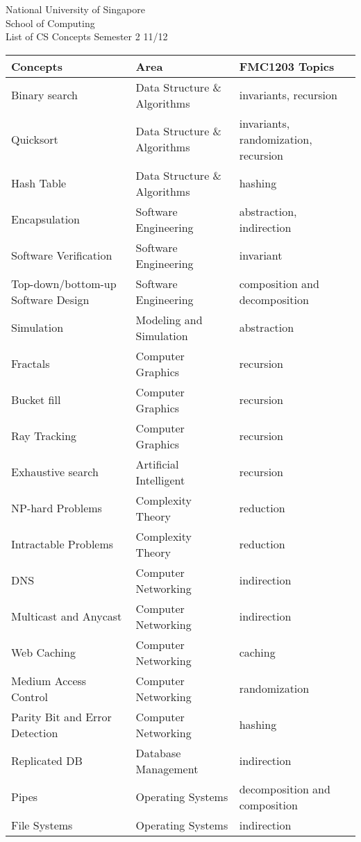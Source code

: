\documentclass[landscape,a4paper,9pt]{exam}
\begin{document}
\extraheadheight{.5in}
%
{\large\sf National University of Singapore\\ School of Computing \\
\LARGE\sf List of CS Concepts}%
{\large\sf Semester 2 11/12}
\firstpageheadrule
\pagestyle{headandfoot}
\centering
\begin{tabular}{|lll|}
\hline
Concepts & Area & FMC1203 Topics \\
\hline
Binary search & Data Structure \& Algorithms & invariants, recursion \\
Quicksort & Data Structure \& Algorithms & invariants, randomization, recursion \\
Hash Table & Data Structure \& Algorithms & hashing \\
\hline
Encapsulation & Software Engineering & abstraction, indirection \\
Software Verification & Software Engineering & invariant\\
Top-down/bottom-up Software Design & Software Engineering & composition and decomposition \\
\hline
Simulation & Modeling and Simulation & abstraction \\
\hline
Fractals & Computer Graphics & recursion \\
Bucket fill & Computer Graphics & recursion \\
Ray Tracking & Computer Graphics & recursion \\
\hline
Exhaustive search & Artificial Intelligent & recursion \\
\hline
NP-hard Problems & Complexity Theory & reduction \\
Intractable Problems & Complexity Theory & reduction \\
\hline
DNS & Computer Networking & indirection \\
Multicast and Anycast  & Computer Networking & indirection \\
Web Caching & Computer Networking & caching \\
Medium Access Control & Computer Networking & randomization \\
Parity Bit and Error Detection & Computer Networking & hashing \\
\hline
Replicated DB & Database Management & indirection \\
\hline
Pipes & Operating Systems & decomposition and composition \\
File Systems & Operating Systems & indirection \\

\end{tabular}
\end{document}

